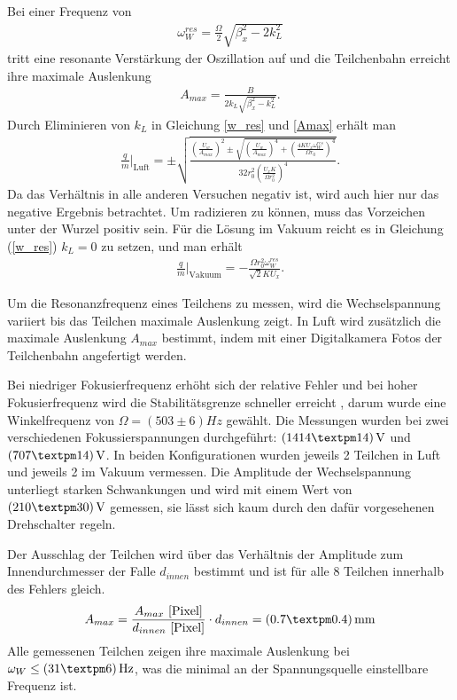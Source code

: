 \documentclass[a4paper,12pt]{article}
\begin{document}
Bei einer Frequenz von
\begin{align}\label{w_res}
	\omega^{res}_W = \frac{\Omega}{2}\sqrt{\beta^{2}_x-2k^{2}_L}
\end{align}
tritt eine resonante Verstärkung der Oszillation auf und die Teilchenbahn erreicht ihre maximale Auslenkung
\begin{align}\label{Amax}
	A_{max} = \frac{B}{2k_L\sqrt{\beta^{2}_x-k^{2}_L}}.
\end{align}
Durch Eliminieren von $k_L$ in Gleichung \ref{w_res} und \ref{Amax} erhält man
\begin{align}\label{res_luft}
	\frac{q}{m}|_{\text{Luft}} = ±\sqrt{
		\frac{
			\left( \frac{U_w}{A_{max}} \right)^2 ± \sqrt{
				\left( \frac{U_w}{A_{max}} \right)^4 + \left( \frac{4KU_xω^{res}_W}{Ω r_0}\right)^4
			} %
		}{
			32r_0^2\left( \frac{U_xK}{Ωr_0^2} \right)^4
		} %
	}. %
\end{align}
Da das Verhältnis in  alle anderen Versuchen negativ ist, wird auch hier nur das negative Ergebnis betrachtet.
Um radizieren zu können, muss das Vorzeichen unter der Wurzel positiv sein.
Für die Lösung im Vakuum reicht es in Gleichung (\ref{w_res}) $k_L=0$ zu setzen, und man erhält
\begin{align}\label{res_vak}
	\frac{q}{m}|_\text{Vakuum} = -\frac{\Omega r^{2}_0 \omega^{res}_W}{\sqrt{2} K U_x}.
\end{align}

Um die Resonanzfrequenz eines Teilchens zu messen, wird die Wechselspannung variiert bis das Teilchen maximale Auslenkung zeigt.
In Luft wird zusätzlich die maximale Auslenkung $A_{max}$ bestimmt, indem mit einer Digitalkamera Fotos der Teilchenbahn angefertigt werden.

Bei niedriger Fokusierfrequenz erhöht sich der relative Fehler und bei hoher Fokusierfrequenz wird die Stabilitätsgrenze schneller erreicht
, darum wurde eine Winkelfrequenz von $Ω = (503±6)\unit{Hz}$ gewählt.
Die Messungen wurden bei zwei verschiedenen Fokussierspannungen durchgeführt: $\unit[(1414±14)]{V}$ und $\unit[(707±14)]{V}$.
In beiden Konfigurationen wurden jeweils 2 Teilchen in Luft und jeweils 2 im Vakuum vermessen.
Die Amplitude der Wechselspannung unterliegt starken Schwankungen und wird mit einem Wert von
$ \unit[( 210 ± 30 )]{V} $ gemessen, sie lässt sich kaum durch den dafür vorgesehenen Drehschalter regeln.

Der Ausschlag der Teilchen wird über das Verhältnis der Amplitude zum Innendurchmesser der Falle $d_{innen}$ bestimmt und ist für alle 8 Teilchen innerhalb des Fehlers gleich.
$$A_{max} = \frac{A_{max}\text{ [Pixel]}}{d_{innen}\text{ [Pixel]}} \cdot d_{innen}= \unit[( 0.7 ± 0.4 )]{mm} $$
Alle gemessenen Teilchen zeigen ihre maximale Auslenkung bei $\omega_W \leq \unit[(31±6)]{Hz}$,
was die minimal an der Spannungsquelle einstellbare Frequenz ist.
\end{document}

